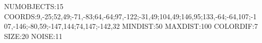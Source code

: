 NUMOBJECTS:15
COORDS:9,-25;52,49;-71,-83;64,-64;97,-122;-31,49;104,49;146,95;133,-64;-64,107;-107,-146;-80,59;-147,144;74,147;-142,32
MINDIST:50
MAXDIST:100
COLORDIF:7
SIZE:20
NOISE:11
